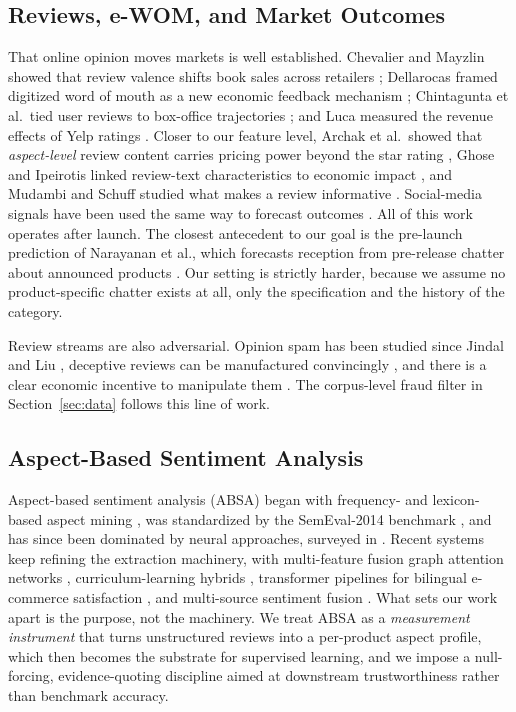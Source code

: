 \documentclass[journal]{IEEEtran}
\begin{document}
\subsection{Reviews, e-WOM, and Market Outcomes}
That online opinion moves markets is well established. Chevalier and Mayzlin showed that review valence shifts book sales across retailers \cite{chevalier2006wom}; Dellarocas framed digitized word of mouth as a new economic feedback mechanism \cite{dellarocas2003digitization}; Chintagunta et al.\ tied user reviews to box-office trajectories \cite{chintagunta2010effects}; and Luca measured the revenue effects of Yelp ratings \cite{luca2016reviews}. Closer to our feature level, Archak et al.\ showed that \emph{aspect-level} review content carries pricing power beyond the star rating \cite{archak2011deriving}, Ghose and Ipeirotis linked review-text characteristics to economic impact \cite{ghose2011estimating}, and Mudambi and Schuff studied what makes a review informative \cite{mudambi2010helpful}. Social-media signals have been used the same way to forecast outcomes \cite{asur2010predicting}. All of this work operates after launch. The closest antecedent to our goal is the pre-launch prediction of Narayanan et al., which forecasts reception from pre-release chatter about announced products \cite{narayanan2020prelaunch}. Our setting is strictly harder, because we assume no product-specific chatter exists at all, only the specification and the history of the category.

Review streams are also adversarial. Opinion spam has been studied since Jindal and Liu \cite{jindal2008opinion}, deceptive reviews can be manufactured convincingly \cite{ott2011deceptive}, and there is a clear economic incentive to manipulate them \cite{mayzlin2014promotional}. The corpus-level fraud filter in Section~\ref{sec:data} follows this line of work.

\subsection{Aspect-Based Sentiment Analysis}
Aspect-based sentiment analysis (ABSA) began with frequency- and lexicon-based aspect mining \cite{hu2004mining,liu2012sentiment}, was standardized by the SemEval-2014 benchmark \cite{pontiki2014semeval}, and has since been dominated by neural approaches, surveyed in \cite{zhang2022survey}. Recent systems keep refining the extraction machinery, with multi-feature fusion graph attention networks \cite{wang2025multifeature}, curriculum-learning hybrids \cite{lange2025curriculum}, transformer pipelines for bilingual e-commerce satisfaction \cite{shan2025bilingual}, and multi-source sentiment fusion \cite{sesr2025multisource}. What sets our work apart is the purpose, not the machinery. We treat ABSA as a \emph{measurement instrument} that turns unstructured reviews into a per-product aspect profile, which then becomes the substrate for supervised learning, and we impose a null-forcing, evidence-quoting discipline aimed at downstream trustworthiness rather than benchmark accuracy.
\end{document}
